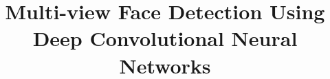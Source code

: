 \documentclass{sig-alternate-2013}
\begin{document}
%

\title{Multi-view Face Detection Using Deep Convolutional Neural Networks}

%
%
%
%
%
\end{document}
